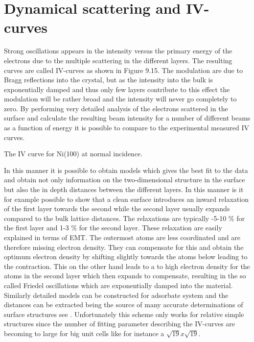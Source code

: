 \section{Dynamical scattering and IV-curves}



 Strong oscillations appears in the intensity versus the  primary energy of the electrons due to the multiple scattering in the different layers. The resulting curves are called IV-curves as shown in Figure 9.15.  The modulation are due to Bragg reflections into the crystal, but as the intensity into the bulk is exponentially damped and thus only  few layers contribute to this effect the modulation will be rather broad and the intensity will never go completely  to zero.  By performing very detailed analysis of the electrons scattered in the surface and calculate the resulting beam intensity for a number of different beams as a function of energy it is possible to compare to the experimental measured  IV curves.

\vspace*{11cm}

 The IV curve for Ni(100) at normal incidence.

\vspace{1cm}


 In this manner it is possible to obtain models which gives the best fit to the  data and obtain not only information on the two-dimensional structure in the surface but also the in depth distances between the different layers. In this manner is it for example  possible to show that a clean  surface introduces an inward  relaxation of the first layer towards the second while the second layer usually expands compared to the bulk lattice distances. The relaxations are typically -5-10 \% for the first layer and 1-3 \% for the second layer. These relaxation are easily explained in terms of EMT. The outermost atoms are less coordinated and are therefore missing  electron density. They can compensate for this and obtain the optimum electron density by shifting slightly towards the atoms below leading to the contraction. This on the other hand leads to a to high electron density for the atoms in the second layer which then expands to compensate, resulting in the so called Friedel oscillations which are exponentially damped into the material. Similarly detailed models can be constructed for adsorbate system and the distances can be extracted being the source of many accurate determinations of surface structures see \cite{Somorjai}. Unfortunately this scheme only works for relative simple structures since the number of fitting parameter describing the IV-curves  are becoming to large for  big unit cells like for instance a $\sqrt{19} x \sqrt{19}$.
